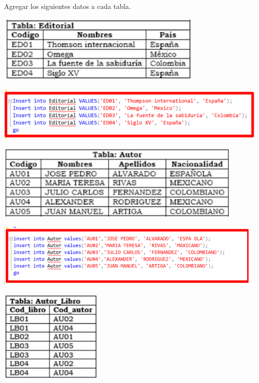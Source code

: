 \documentclass[12pt,letterpaper]{article}
\begin{document}
Agregar los siguientes datos a cada tabla.
\begin{center}
    \includegraphics[width=10cm]{img/graph1.png}  
\end{center}
\begin{center}
    \includegraphics[width=15cm]{img/3.png}  
\end{center}
\begin{center}
    \includegraphics[width=12cm]{img/graph4.png}  
\end{center}
\begin{center}
    \includegraphics[width=13cm]{img/5.png}  
\end{center}
\begin{center}
    \includegraphics[width=5cm]{img/graph3.png}  
\end{center}
\end{document}

